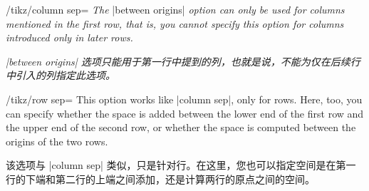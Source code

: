 \begin{key}{/tikz/column sep=}
    \emph{The }|between origins|\emph{ option can only be used for columns
    mentioned in the first row, that is, you cannot specify this option for
    columns introduced only in later rows.}

    \emph{|between origins| 选项只能用于第一行中提到的列，也就是说，不能为仅在后续行中引入的列指定此选项。}

\begin{codeexample}[]
\end{codeexample}
\end{key}

\begin{key}{/tikz/row sep=}
    This option works like |column sep|, only for rows. Here, too, you can
    specify whether the space is added between the lower end of the first row
    and the upper end of the second row, or whether the space is computed
    between the origins of the two rows.
    
    该选项与 |column sep| 类似，只是针对行。在这里，您也可以指定空间是在第一行的下端和第二行的上端之间添加，还是计算两行的原点之间的空间。

%
\begin{codeexample}[]
\end{codeexample}
\begin{codeexample}[]
\end{codeexample}
\end{key}

